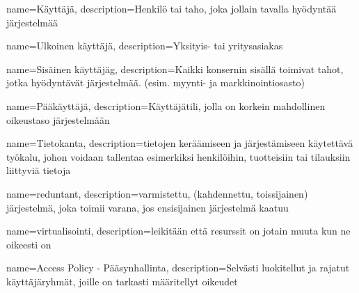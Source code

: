     {
    name={Käyttäjä},
    description={Henkilö tai taho, joka jollain tavalla hyödyntää järjestelmää}
    }

    {
    name={Ulkoinen käyttäjä},
    description={Yksityis- tai yritysasiakas}
    }

    {
    name={Sisäinen käyttäjäg},
    description={Kaikki konsernin sisällä toimivat tahot, jotka hyödyntävät järjestelmää. (esim. myynti- ja markkinointiosasto)}
    }

    {
    name={Pääkäyttäjä},
    description={Käyttäjätili, jolla on korkein mahdollinen oikeustaso järjestelmään}
    }

    {
    name={Tietokanta},
    description={tietojen keräämiseen ja järjestämiseen käytettävä työkalu, johon voidaan tallentaa esimerkiksi henkilöihin, tuotteisiin tai tilauksiin liittyviä tietoja}
    }

    {
    name={reduntant},
    description={varmistettu, (kahdennettu, toissijainen) järjestelmä, joka toimii varana, jos ensisijainen järjestelmä kaatuu}
    }

    {
    name={virtualisointi},
    description={leikitään että resurssit on jotain muuta kun ne oikeesti on}
    }

    {
    name={Access Policy - Pääsynhallinta},
    description={Selvästi luokitellut ja rajatut käyttäjäryhmät, joille on tarkasti määritellyt oikeudet}
    }

        



